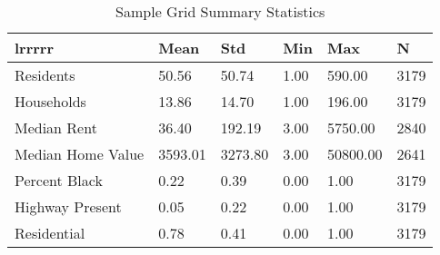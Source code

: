 \begin{table}[h]
\centering
\caption{Sample Grid Summary Statistics}
\label{tab:summary_stats}
\begin{tabularx}{\textwidth}{X|X|X|X|X|X}{lrrrrr}
\toprule
 & Mean & Std & Min & Max & N \\
\midrule
Residents & 50.56 & 50.74 & 1.00 & 590.00 & 3179 \\
Households & 13.86 & 14.70 & 1.00 & 196.00 & 3179 \\
Median Rent & 36.40 & 192.19 & 3.00 & 5750.00 & 2840 \\
Median Home Value & 3593.01 & 3273.80 & 3.00 & 50800.00 & 2641 \\
Percent Black & 0.22 & 0.39 & 0.00 & 1.00 & 3179 \\
Highway Present & 0.05 & 0.22 & 0.00 & 1.00 & 3179 \\
Residential & 0.78 & 0.41 & 0.00 & 1.00 & 3179 \\
\bottomrule
\end{tabularx}
\end{table}
